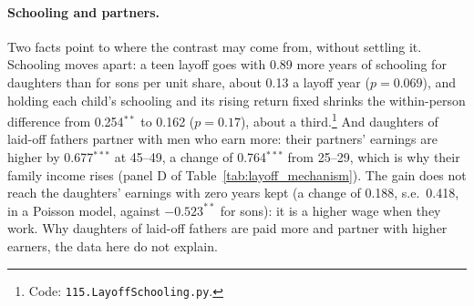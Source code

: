 \paragraph{Schooling and partners.} Two facts point to where the contrast may come from, without settling it. Schooling
moves apart: a teen layoff goes with 0.89 more years of schooling for daughters than for sons per unit share, about 0.13 a
layoff year ($p = 0.069$), and holding
each child's schooling and its rising return fixed shrinks the within-person difference from 0.254$^{**}$ to 0.162
($p = 0.17$), about a third.\footnote{Code: \texttt{115.LayoffSchooling.py}.} And
daughters of laid-off fathers partner with men who earn more: their partners' earnings are higher by 0.677$^{***}$ at 45--49, a change of 0.764$^{***}$ from 25--29,
which is why their family income rises (panel D of Table~\ref{tab:layoff_mechanism}). The gain does not reach the
daughters' earnings with zero years kept (a change of 0.188, s.e.\ 0.418, in a Poisson model, against $-0.523^{**}$ for
sons): it is a higher wage when they work. Why daughters of laid-off fathers are paid more and partner with higher
earners, the data here do not explain.
